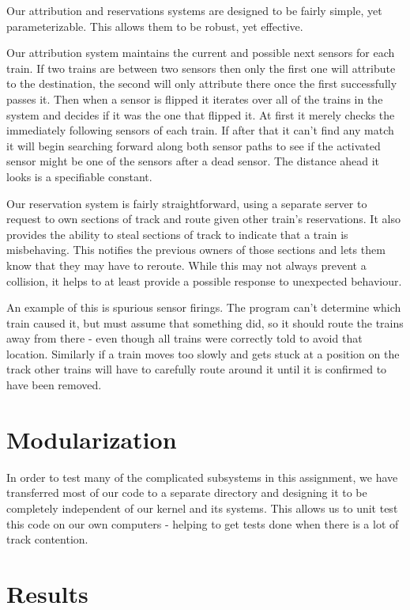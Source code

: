 \documentclass{amsart} \usepackage{amsmath} \usepackage{upgreek}
\begin{document}
Our attribution and reservations systems are designed to be fairly simple, yet
parameterizable. This allows them to be robust, yet effective.

Our attribution system maintains the current and possible next sensors for each
train. If two trains are between two sensors then only the first one will
attribute to the destination, the second will only attribute there once the
first successfully passes it. Then when a sensor is flipped it iterates over all
of the trains in the system and decides if it was the one that flipped it. At
first it merely checks the immediately following sensors of each train. If after
that it can't find any match it will begin searching forward along both sensor
paths to see if the activated sensor might be one of the sensors after a dead
sensor. The distance ahead it looks is a specifiable constant.

Our reservation system is fairly straightforward, using a separate server to
request to own sections of track and route given other train's reservations. It
also provides the ability to steal sections of track to indicate that a train is
misbehaving. This notifies the previous owners of those sections and lets them
know that they may have to reroute. While this may not always prevent a
collision, it helps to at least provide a possible response to unexpected
behaviour.

An example of this is spurious sensor firings. The program can't determine which
train caused it, but must assume that something did, so it should route the
trains away from there - even though all trains were correctly told to avoid
that location. Similarly if a train moves too slowly and gets stuck at a
position on the track other trains will have to carefully route around it until
it is confirmed to have been removed.

\section*{Modularization}

In order to test many of the complicated subsystems in this assignment, we have
transferred most of our code to a separate directory and designing it to be
completely independent of our kernel and its systems. This allows us to unit
test this code on our own computers - helping to get tests done when there is a
lot of track contention.

\section*{Results}
\end{document}
